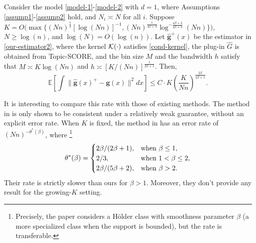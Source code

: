 \documentclass[preprint,11pt]{article}
\newcommand{\mbb}{\mathbb}
\numberwithin{equation}{section}
\begin{document}
\begin{thm}\label{thm:upperbound}
Consider the model \eqref{model-1}-\eqref{model-2} with $d=1$, where Assumptions \ref{assump1}-\ref{assump2} hold, and $N_i\asymp N$ for all $i$. Suppose $
K=O\bigl(\max\bigl\{(Nn)^{\frac{1}{4}}[\log(Nn)]^{-1},(Nn)^{\frac{1}{4\beta+3}}\log^{-\frac{4\beta+2}{4\beta+3}}(Nn)\bigr\}\bigr)$, $N\geq \log(n)$, and $\log(N)=O(\log(n))$. Let $\widehat{\boldsymbol g}^+(x)$ be the estimator in \eqref{our-estimator2}, where the kernel ${\cal K}(\cdot)$ satisfies \eqref{cond-kernel}, 
the plug-in $\widehat{G}$ is obtained from Topic-SCORE, 
and the bin size $M$ and the bandwidth $h$ satisfy that $M\asymp K\log(Nn)$ and $h\asymp [K/(Nn)]^{\frac{1}{2\beta+1}}$. Then, 
\[
\mbb{E}\left[\int \|\widehat{\bm{g}}(x)^+-\bm{g}(x)\|^2dx\right]\le C \cdot K\left( \frac{K}{Nn} \right)^{\frac{2\beta}{2\beta+1}}. 
\]
\end{thm}



It is interesting to compare this rate with those of existing methods. The method in \cite{katz2019decontamination} is only shown to be consistent under a relatively weak guarantee, without an explicit error rate. When $K$ is fixed, the method in \cite{austern2025poisson} has an error rate of $(Nn)^{-\theta^*(\beta)}$, where \footnote{Precisely, the paper considers a H\"{o}lder class with smoothness parameter $\beta$ (a more specialized class when the support is bounded), but the rate is transferable.}
\[
\theta^*(\beta) = \begin{cases}
2\beta/(2\beta+1), & \mbox{when }\beta\leq 1,\cr
2/3, & \mbox{when }1<\beta\leq 2, \cr
2\beta/(5\beta+2), & \mbox{when }\beta>2. 
\end{cases}
\]
Their rate is strictly slower than ours for $
\beta>1$. 
Moreover, they don't provide any result for the growing-$K$ setting. 
\end{document}
